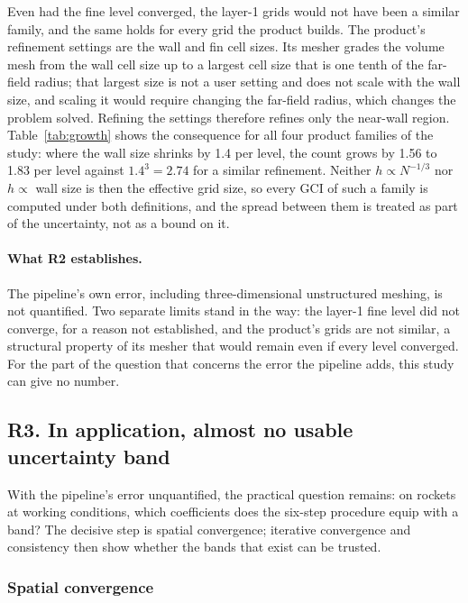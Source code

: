 \documentclass[twocolumn]{labreport}
\begin{document}
Even had the fine level converged, the layer-1 grids would not have been a similar family, and the same holds for every grid the product builds.
The product's refinement settings are the wall and fin cell sizes.
Its mesher grades the volume mesh from the wall cell size up to a largest cell size that is one tenth of the far-field radius; that largest size is not a user setting and does not scale with the wall size, and scaling it would require changing the far-field radius, which changes the problem solved.
Refining the settings therefore refines only the near-wall region.
Table~\ref{tab:growth} shows the consequence for all four product families of the study: where the wall size shrinks by 1.4 per level, the count grows by 1.56 to 1.83 per level against $1.4^3=2.74$ for a similar refinement.
Neither $h\propto N^{-1/3}$ nor $h\propto$ wall size is then the effective grid size, so every GCI of such a family is computed under both definitions, and the spread between them is treated as part of the uncertainty, not as a bound on it.

\paragraph{What R2 establishes.}
The pipeline's own error, including three-dimensional unstructured meshing, is not quantified.
Two separate limits stand in the way: the layer-1 fine level did not converge, for a reason not established, and the product's grids are not similar, a structural property of its mesher that would remain even if every level converged.
For the part of the question that concerns the error the pipeline adds, this study can give no number.

\subsection{R3. In application, almost no usable uncertainty band}
\label{sec:r3}

With the pipeline's error unquantified, the practical question remains: on rockets at working conditions, which coefficients does the six-step procedure equip with a band?
The decisive step is spatial convergence; iterative convergence and consistency then show whether the bands that exist can be trusted.

\subsubsection{Spatial convergence}
\label{sec:grid}
\end{document}
